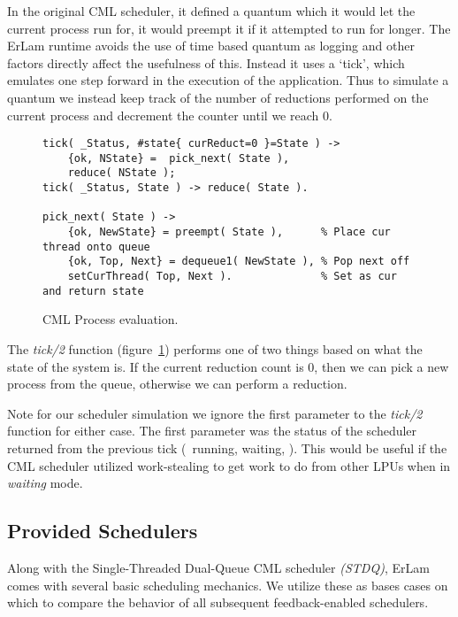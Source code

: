 In the original CML scheduler, it defined a quantum which it would let the 
current process run for, it would preempt it if it attempted to run 
for longer. The ErLam runtime avoids the use of time based quantum as logging 
and other factors directly affect the usefulness of this. Instead it uses a 
`tick', which emulates one
step forward in the execution of the application. Thus to simulate a quantum we
instead keep track of the number of reductions performed on the current process
and decrement the counter until we reach $0$.

\begin{figure}
\begin{verbatim}
tick( _Status, #state{ curReduct=0 }=State ) ->
    {ok, NState} =  pick_next( State ),
    reduce( NState );
tick( _Status, State ) -> reduce( State ).

pick_next( State ) ->
    {ok, NewState} = preempt( State ),      % Place cur thread onto queue
    {ok, Top, Next} = dequeue1( NewState ), % Pop next off
    setCurThread( Top, Next ).              % Set as cur and return state
\end{verbatim}
\caption{CML Process evaluation.}
\label{fig:cml-tick}
\end{figure}

The \emph{tick/2} function (figure~\ref{fig:cml-tick}) performs one of two 
things based on what the state of the system is. If the current reduction count 
is $0$, then we can pick a new process from the queue, otherwise we can perform
a reduction. 

Note for our scheduler simulation we ignore the first parameter to the 
\emph{tick/2} function for either case. The first parameter was the status of 
the scheduler returned from the previous tick (\eg~running, waiting, \etc). This 
would be useful if the CML scheduler utilized work-stealing to get work to do
from other LPUs when in \emph{waiting} mode.

\subsection{Provided Schedulers}

Along with the Single-Threaded Dual-Queue CML scheduler {\sl (STDQ)}, ErLam 
comes with several basic scheduling mechanics. We utilize these as bases cases 
on which to compare the behavior of all subsequent feedback-enabled schedulers.

